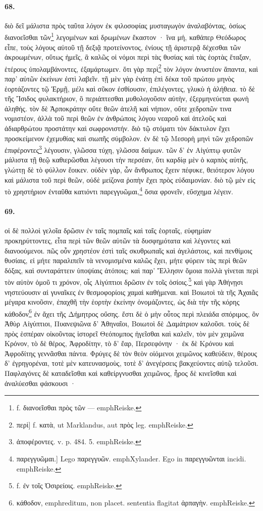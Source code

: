 \documentclass[a4paper, 11pt, oneside, polutonikogreek, german]{article}
\begin{document}
\paragraph{68.}
διὸ δεῖ μάλιστα πρὸς ταῦτα λόγον ἐκ φιλοσοφίας μυσταγωγὸν ἀναλαβόντας, ὁσίως διανοεῖσθαι τῶν\footnote{f. διανοεῖσθαι πρὸς τῶν --- emph{Reiske.}} λεγομένων καὶ δρωμένων ἕκαστον · ἵνα μή, καθάπερ Θεόδωρος εἶπε, τοὺς λόγους αὐτοῦ τῇ δεξιᾷ προτείνοντος, ἐνίους τῇ ἀριστερᾷ δέχεσθαι τῶν ἀκροωμένων, οὕτως ἡμεῖς, ἃ καλῶς οἱ νόμοι περὶ τὰς θυσίας καὶ τὰς ἑορτὰς ἔταξαν, ἑτέρους ὑπολαμβάνοντες, ἐξαμάρτωμεν. ὅτι γὰρ περὶ\footnote{περὶ] f. κατὰ, ut Marklandus, aut πρὸς leg. emph{Reiske.}} τὸν λόγον ἀνυστέον ἅπαντα, καὶ παρ' αὐτῶν ἐκείνων ἐστὶ λαβεῖν. τῇ μὲν γὰρ ἐνάτῃ ἐπὶ δέκα τοῦ πρώτου μηνὸς ἑορτάζοντες τῷ Ἑρμῇ, μέλι καὶ σῦκον ἐσθίουσιν, ἐπιλέγοντες, γλυκὺ ἡ ἀλήθεια. τὸ δὲ τῆς Ἴσιδος φυλακτήριον, ὃ περιάπτεσθαι μυθολογοῦσιν αὐτὴν, ἐξερμηνεύεται φωνὴ ἀληθής. τὸν δὲ Ἁρποκράτην οὔτε θεῶν ἀτελῆ καὶ νήπιον, οὔτε χεδροπῶν τινα νομιστέον, ἀλλὰ τοῦ περὶ θεῶν ἐν ἀνθρώποις λόγου νεαροῦ καὶ ἀτελοῦς καὶ ἀδιαρθρώτου προστάτην καὶ σωφρονιστήν. διὸ τῷ στόματι τὸν δάκτυλον ἔχει προσκείμενον ἐχεμυθίας καὶ σιωπῆς σύμβολον. ἐν δὲ τῷ Μεσορὴ μηνὶ τῶν χεδροπῶν ἐπιφέροντες\footnote{ἀποφέροντες. v. p. 484. 5. emph{Reiske.}} λέγουσιν, γλῶσσα τύχη, γλῶσσα δαίμων. τῶν δ' ἐν Αἰγύπτῳ φυτῶν μάλιστα τῇ θεῷ καθιερῶσθαι λέγουσι τὴν περσέαν, ὅτι καρδίᾳ μὲν ὁ καρπὸς αὐτῆς, γλώττῃ δὲ τὸ φύλλον ἔοικεν. οὐδὲν γὰρ, ὧν ἄνθρωπος ἔχειν πέφυκε, θειότερον λόγου καὶ μάλιστα τοῦ περὶ θεῶν, οὐδὲ μείζονα ῥοπὴν ἔχει πρὸς εὐδαιμονίαν. διὸ τῷ μὲν εἰς τὸ χρηστήριον ἐνταῦθα κατιόντι παρεγγυῶμαι,\footnote{παρεγγυῶμαι.] Lego παρεγγυῶν. emph{Xylander.} Ego in παρεγγυῶνται incidi. emph{Reiske.}} ὅσια φρονεῖν, εὔσχημα λέγειν.

\paragraph{69.}
οἱ δὲ πολλοὶ γελοῖα δρῶσιν ἐν ταῖς πομπαῖς καὶ ταῖς ἑορταῖς, εὐφημίαν προκηρύττοντες, εἶτα περὶ τῶν θεῶν αὐτῶν τὰ δυσφημότατα καὶ λέγοντες καὶ διανοούμενοι. πῶς οὖν χρηστέον ἐστὶ ταῖς σκυθρωπαῖς καὶ ἀγελάστοις, καὶ πενθίμοις θυσίαις, εἰ μήτε παραλιπεῖν τὰ νενομισμένα καλῶς ἔχει, μήτε φύρειν τὰς περὶ θεῶν δόξας, καὶ συνταράττειν ὑποψίαις ἀτόποις; καὶ παρ' Ἕλλησιν ὅμοια πολλὰ γίνεται περὶ τὸν αὐτὸν ὁμοῦ τι χρόνον, οἷς Αἰγύπτιοι δρῶσιν ἐν τοῖς ὁσίοις.\footnote{f. ἐν τοῖς Ὀσιρείοις. emph{Reiske.}} καὶ γὰρ Ἀθήνῃσι νηστεύουσιν αἱ γυναῖκες ἐν θεσμοφορίοις χαμαὶ καθήμεναι. καὶ Βοιωτοὶ τὰ τῆς Ἀχαιᾶς μέγαρα κινοῦσιν, ἐπαχθῆ τὴν ἑορτὴν ἐκείνην ὀνομάζοντες, ὡς διὰ τὴν τῆς κόρης κάθοδον\footnote{κάθοδον, emph{reditum}, non placet. sententia flagitat ἁρπαγὴν. emph{Reiske.} } ἐν ἄχει τῆς Δήμητρος οὔσης. ἔστι δὲ ὁ μὴν οὗτος περὶ πλειάδα σπόριμος, ὃν Ἀθὺρ Αἰγύπτιοι, Πυανεψιῶνα δ' Ἀθηναῖοι, Βοιωτοὶ δὲ Δαμάτριον καλοῦσι. τοὺς δὲ πρὸς ἑσπέραν οἰκοῦντας ἱστορεῖ Θεόπομπος ἡγεῖσθαι καὶ καλεῖν, τὸν μὲν χειμῶνα Κρόνον, τὸ δὲ θέρος, Ἀφροδίτην, τὸ δ' ἔαρ, Περσεφόνην · ἐκ δὲ Κρόνου καὶ Ἀφροδίτης γεννᾶσθαι πάντα. Φρύγες δὲ τὸν θεὸν οἰόμενοι χειμῶνος καθεύδειν, θέρους δ' ἐγρηγορέναι, τοτὲ μὲν κατευνασμοὺς, τοτὲ δ' ἀνεγέρσεις βακχεύοντες αὐτῷ τελοῦσι. Παφλαγόνες δὲ καταδεῖσθαι καὶ καθείργνυσθαι χειμῶνος, ἦρος δὲ κινεῖσθαι καὶ ἀναλύεσθαι φάσκουσι ·
\end{document}
